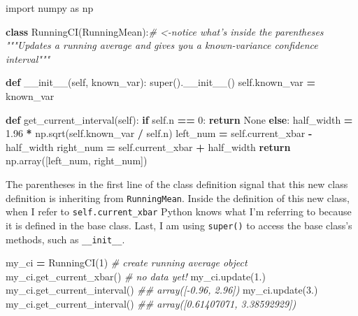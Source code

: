 \documentclass[12pt,krantz2]{krantz}
\makeatletter
\newenvironment{Shaded}{\begin{snugshade}}{\end{snugshade}}
\newcommand{\BuiltInTok}[1]{#1}
\newcommand{\CommentTok}[1]{\textcolor[rgb]{0.37,0.37,0.37}{\textit{#1}}}
\newcommand{\ControlFlowTok}[1]{\textcolor[rgb]{0.27,0.27,0.27}{\textbf{#1}}}
\newcommand{\DecValTok}[1]{\textcolor[rgb]{0.06,0.06,0.06}{#1}}
\newcommand{\FloatTok}[1]{\textcolor[rgb]{0.06,0.06,0.06}{#1}}
\newcommand{\FunctionTok}[1]{\textcolor[rgb]{0,0,0}{#1}}
\newcommand{\ImportTok}[1]{#1}
\newcommand{\KeywordTok}[1]{\textcolor[rgb]{0.27,0.27,0.27}{\textbf{#1}}}
\newcommand{\NormalTok}[1]{#1}
\newcommand{\OperatorTok}[1]{\textcolor[rgb]{0.43,0.43,0.43}{\textbf{#1}}}
\newcommand{\VariableTok}[1]{\textcolor[rgb]{0,0,0}{#1}}
\newenvironment{kframe}{%
\medskip{}
\setlength{\fboxsep}{.8em}
 \def\at@end@of@kframe{}%
 \ifinner\ifhmode%
  \def\at@end@of@kframe{\end{minipage}}%
  \begin{minipage}{\columnwidth}%
 \fi\fi%
 \def\FrameCommand##1{\hskip\@totalleftmargin \hskip-\fboxsep
 \colorbox{shadecolor}{##1}\hskip-\fboxsep
     \hskip-\linewidth \hskip-\@totalleftmargin \hskip\columnwidth}%
 \MakeFramed {\advance\hsize-\width
   \@totalleftmargin\z@ \linewidth\hsize
   \@setminipage}}%
 {\par\unskip\endMakeFramed%
 \at@end@of@kframe}
\renewenvironment{Shaded}{\begin{kframe}}{\end{kframe}}
\makeatother
\begin{document}
\begin{Shaded}
\begin{Highlighting}[]
\ImportTok{import}\NormalTok{ numpy }\ImportTok{as}\NormalTok{ np}

\KeywordTok{class}\NormalTok{ RunningCI(RunningMean):}\CommentTok{# <-notice what's inside the parentheses}
    \CommentTok{"""Updates a running average and }
\CommentTok{    gives you a known-variance confidence interval"""}
    
    \KeywordTok{def} \FunctionTok{__init__}\NormalTok{(}\VariableTok{self}\NormalTok{, known_var):}
        \BuiltInTok{super}\NormalTok{().}\FunctionTok{__init__}\NormalTok{()}
        \VariableTok{self}\NormalTok{.known_var }\OperatorTok{=}\NormalTok{ known_var}
        
    \KeywordTok{def}\NormalTok{ get_current_interval(}\VariableTok{self}\NormalTok{):}
        \ControlFlowTok{if} \VariableTok{self}\NormalTok{.n }\OperatorTok{==} \DecValTok{0}\NormalTok{:}
            \ControlFlowTok{return} \VariableTok{None}
        \ControlFlowTok{else}\NormalTok{:}
\NormalTok{            half_width }\OperatorTok{=} \FloatTok{1.96} \OperatorTok{*}\NormalTok{ np.sqrt(}\VariableTok{self}\NormalTok{.known_var }\OperatorTok{/} \VariableTok{self}\NormalTok{.n)  }
\NormalTok{            left_num }\OperatorTok{=} \VariableTok{self}\NormalTok{.current_xbar }\OperatorTok{-}\NormalTok{ half_width}
\NormalTok{            right_num }\OperatorTok{=} \VariableTok{self}\NormalTok{.current_xbar }\OperatorTok{+}\NormalTok{ half_width}
            \ControlFlowTok{return}\NormalTok{ np.array([left_num, right_num])}
\end{Highlighting}
\end{Shaded}

The parentheses in the first line of the class definition signal that this new class definition is inheriting from \texttt{RunningMean}. Inside the definition of this new class, when I refer to \texttt{self.current\_xbar} Python knows what I'm referring to because it is defined in the base class. Last, I am using \texttt{super()} to access the base class's methods, such as \texttt{\_\_init\_\_}.

\begin{Shaded}
\begin{Highlighting}[]
\NormalTok{my_ci }\OperatorTok{=}\NormalTok{ RunningCI(}\DecValTok{1}\NormalTok{) }\CommentTok{# create running average object}
\NormalTok{my_ci.get_current_xbar() }\CommentTok{# no data yet!}
\NormalTok{my_ci.update(}\FloatTok{1.}\NormalTok{) }
\NormalTok{my_ci.get_current_interval() }
\CommentTok{## array([-0.96,  2.96])}
\NormalTok{my_ci.update(}\FloatTok{3.}\NormalTok{)  }
\NormalTok{my_ci.get_current_interval()  }
\CommentTok{## array([0.61407071, 3.38592929])}
\end{Highlighting}
\end{Shaded}
\end{document}
